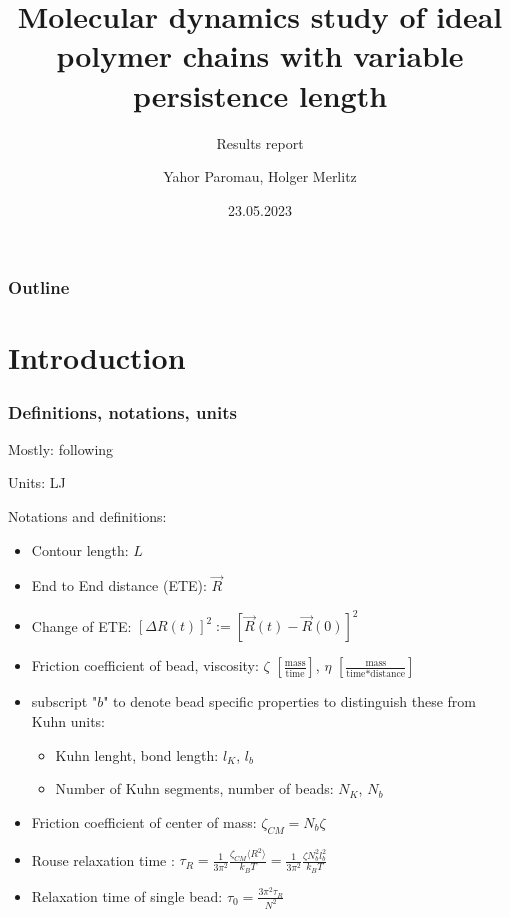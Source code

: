 \documentclass[handout]{beamer}
\title{Molecular dynamics study of ideal polymer chains with variable persistence length}
\subtitle{Results report}
\author{Yahor Paromau, Holger Merlitz}
\institute{ITP@IPF}
\date{23.05.2023}
\newcommand{\mean}[1]{\langle #1 \rangle}
\begin{document}
\begin{frame}
    \titlepage
\end{frame}


\begin{frame}
    \frametitle{Outline}
    \tableofcontents
\end{frame}

\section{Introduction}

\begin{frame}
    \frametitle{Definitions, notations, units}
    Mostly: following \cite{svaneborg_2020}

    Units: LJ

    Notations and definitions:

    \begin{itemize}
        \item Contour length: $L$
        \item End to End distance (ETE): $\vec{R}$
        \item Change of ETE: $[\Delta R(t)]^2 := [\vec{R}(t)-\vec{R}(0)]^2$
        \item Friction coefficient of bead, viscosity: $\zeta$ $[\frac{\textrm{mass}}{\textrm{time}}]$, $\eta$ $[\frac{\textrm{mass}}{\textrm{time} * \textrm{distance}}]$
        \item subscript "$b$" to denote bead speciﬁc properties to distinguish these from Kuhn units:
            \begin{itemize}
                \item Kuhn lenght, bond length: $l_K$, $l_b$
                \item Number of Kuhn segments, number of beads: $N_K$, $N_b$
            \end{itemize}
        \item Friction coefficient of center of mass: $\zeta_{CM}=N_b \zeta$ 
        \item Rouse relaxation time \cite{svaneborg_2020}: $\tau_R = \frac{1}{3 \pi^2} \frac{\zeta_{CM} \mean{R^2}}{k_B T} = \frac{1}{3 \pi^2} \frac{\zeta N_b^2 l_b^2}{k_B T}$
        \item Relaxation time of single bead: $\tau_0 = \frac{3\pi^2 \tau_R}{N^2}$ 
    \end{itemize}

\end{frame}
\end{document}
